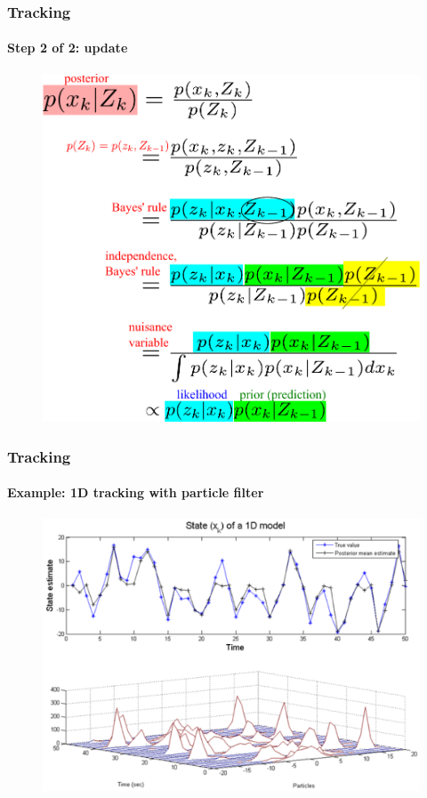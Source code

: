 \begin{frame}
\frametitle{Tracking}
\framesubtitle{Step 2 of 2: update}
\mypagenum{}
\begin{figure}
\includegraphics[height=0.8\textheight]{figs/TRK_EQN_update.pdf}
\end{figure}
\end{frame}


\begin{frame}
\frametitle{Tracking}
\framesubtitle{Example: 1D tracking with particle filter}
\mypagenum{}
\begin{figure}
\includegraphics[width=1.0\textwidth]{figs/TRK_ParticleFilter_multimodalPDF.pdf}
\end{figure}	
\end{frame}



